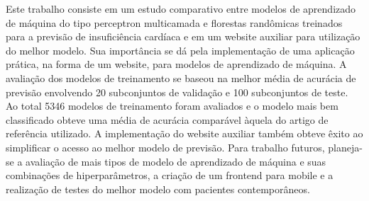 Este trabalho consiste em um estudo comparativo entre modelos de aprendizado de máquina do tipo perceptron multicamada e florestas randômicas treinados para a previsão de insuficiência cardíaca e em um website auxiliar para utilização do melhor modelo. Sua importância se dá pela implementação de uma aplicação prática, na forma de um website, para modelos de aprendizado de máquina. A avaliação dos modelos de treinamento se baseou na melhor média de acurácia de previsão envolvendo 20 subconjuntos de validação e 100 subconjuntos de teste. Ao total 5346 modelos de treinamento foram avaliados e o modelo mais bem classificado obteve uma média de acurácia comparável àquela do artigo de referência utilizado. A implementação do website auxiliar também obteve êxito ao simplificar o acesso ao melhor modelo de previsão. Para trabalho futuros, planeja-se a avaliação de mais tipos de modelo de aprendizado de máquina e suas combinações de hiperparâmetros, a criação de um frontend para mobile e a realização de testes do melhor modelo com pacientes contemporâneos.

